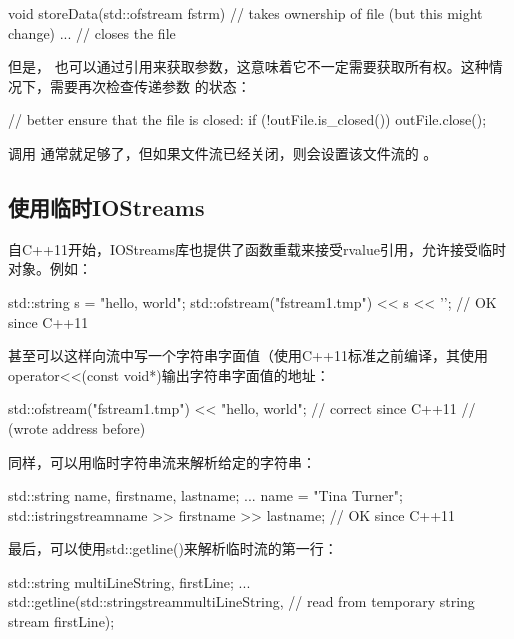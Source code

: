 \begin{cppcode}
void storeData(std::ofstream fstrm) // takes ownership of file (but this might change)
{
	...
} // closes the file
\end{cppcode}

但是， 也可以通过引用来获取参数，这意味着它不一定需要获取所有权。这种情况下，需要再次检查传递参数  的状态：

\begin{cppcode}
// better ensure that the file is closed:
if (!outFile.is_closed()) {
	outFile.close();
}
\end{cppcode}

调用  通常就足够了，但如果文件流已经关闭，则会设置该文件流的 。

\subsection{使用临时IOStreams}

自C++11开始，IOStreams库也提供了函数重载来接受rvalue引用，允许接受临时对象。例如：

\begin{cppcode}
std::string s = "hello, world";
std::ofstream("fstream1.tmp") << s << '\n'; // OK since C++11
\end{cppcode}

甚至可以这样向流中写一个字符串字面值（使用C++11标准之前编译，其使用operator<<(const void*)输出字符串字面值的地址：

\begin{cppcode}
std::ofstream("fstream1.tmp") << "hello, world\n"; // correct since C++11
// (wrote address before)
\end{cppcode}

同样，可以用临时字符串流来解析给定的字符串：

\begin{cppcode}
std::string name, firstname, lastname;
...
name = "Tina Turner";
std::istringstream{name} >> firstname >> lastname; // OK since C++11
\end{cppcode}

最后，可以使用std::getline()来解析临时流的第一行：

\begin{cppcode}
std::string multiLineString, firstLine;
...
std::getline(std::stringstream{multiLineString}, // read from temporary string stream
firstLine);
\end{cppcode}



























